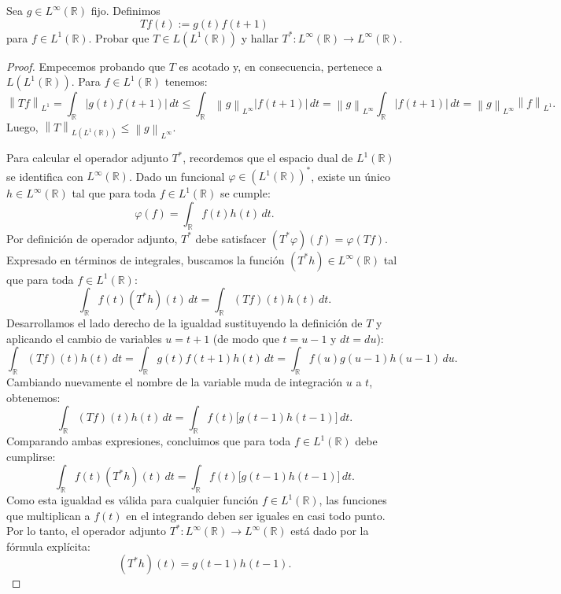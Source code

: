 \documentclass{article}
\theoremstyle{definition}
\newcommand{\R}{\mathbb{R}}
\newcommand{\norm}[1]{\left\lVert #1 \right\rVert}       %
\newenvironment{ejercicio}[1]{\begin{trivlist}
\item[\hskip \labelsep {\bfseries Ejercicio}\hskip \labelsep {\bfseries #1.}]}{\end{trivlist}}
\begin{document}
\vspace{0.5cm}

\begin{ejercicio}{6}
	Sea \( g\in L^{\infty}(\R) \) fijo. Definimos
	\[ Tf(t) := g(t)f(t+1) \]
	para \( f\in L^{1}(\R) \). Probar que \( T\in L(L^{1}(\R)) \) y hallar \( T^{*}:L^{\infty}(\R)\rightarrow L^{\infty}(\R) \).
\end{ejercicio}
\begin{proof}
	Empecemos probando que \(T\) es acotado y, en consecuencia, pertenece a \(L(L^1(\R))\). Para \(f \in L^1(\R)\) tenemos:
	\[
		\norm{Tf}_{L^1} = \int_{\R} |g(t) f(t+1)| \, dt \le \int_{\R} \norm{g}_{L^\infty} |f(t+1)| \, dt = \norm{g}_{L^\infty} \int_{\R} |f(t+1)| \, dt = \norm{g}_{L^\infty} \norm{f}_{L^1}.
	\]
	Luego, \(\norm{T}_{L(L^1(\R))} \le \norm{g}_{L^\infty}\).

	Para calcular el operador adjunto \(T^*\), recordemos que el espacio dual de \(L^1(\R)\) se identifica con \(L^\infty(\R)\). Dado un funcional \(\varphi \in (L^1(\R))^*\), existe un único \(h \in L^\infty(\R)\) tal que para toda \(f \in L^1(\R)\) se cumple:
	\[
		\varphi(f) = \int_{\R} f(t) h(t) \, dt.
	\]
	Por definición de operador adjunto, \(T^*\) debe satisfacer \((T^*\varphi)(f) = \varphi(Tf)\). Expresado en términos de integrales, buscamos la función \((T^*h) \in L^\infty(\R)\) tal que para toda \(f \in L^1(\R)\):
	\[
		\int_{\R} f(t) (T^*h)(t) \, dt = \int_{\R} (Tf)(t) h(t) \, dt.
	\]
	Desarrollamos el lado derecho de la igualdad sustituyendo la definición de \(T\) y aplicando el cambio de variables \(u = t+1\) (de modo que \(t = u-1\) y \(dt = du\)):
	\[
		\int_{\R} (Tf)(t) h(t) \, dt = \int_{\R} g(t) f(t+1) h(t) \, dt = \int_{\R} f(u) g(u-1) h(u-1) \, du.
	\]
	Cambiando nuevamente el nombre de la variable muda de integración \(u\) a \(t\), obtenemos:
	\[
		\int_{\R} (Tf)(t) h(t) \, dt = \int_{\R} f(t) \big[ g(t-1) h(t-1) \big] \, dt.
	\]
	Comparando ambas expresiones, concluimos que para toda \(f \in L^1(\R)\) debe cumplirse:
	\[
		\int_{\R} f(t) (T^*h)(t) \, dt = \int_{\R} f(t) \big[ g(t-1) h(t-1) \big] \, dt.
	\]
	Como esta igualdad es válida para cualquier función \(f \in L^1(\R)\), las funciones que multiplican a \(f(t)\) en el integrando deben ser iguales en casi todo punto. Por lo tanto, el operador adjunto \(T^*: L^\infty(\R) \rightarrow L^\infty(\R)\) está dado por la fórmula explícita:
	\[
		(T^*h)(t) = g(t-1) h(t-1).
	\]
\end{proof}

\vspace{0.5cm}
\end{document}
